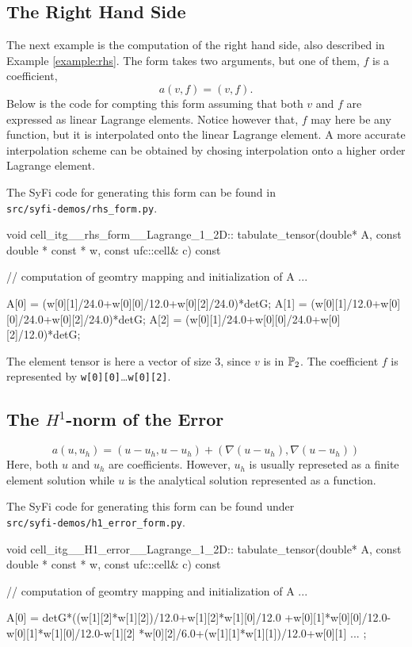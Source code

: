 \subsection{The Right Hand Side}
The next example is the computation of the right hand side, also described in 
Example \ref{example:rhs}. The form takes two arguments, 
but one of them, $f$ is a coefficient,  
\begin{equation}
a(v,f) = (v,f). 
\end{equation}
Below is the code for compting this form assuming that both 
$v$ and $f$ are expressed as linear Lagrange elements. 
Notice  however that, $f$ may here be any function, 
but it is interpolated onto the linear Lagrange element. 
A more accurate interpolation scheme can be obtained 
by chosing interpolation onto a higher order Lagrange element. 


The SyFi code for generating this form can be found in \\
\texttt{src/syfi-demos/rhs\_form.py}.

\begin{code}
void cell_itg__rhs_form__Lagrange_1_2D::
     tabulate_tensor(double* A, const double * const * w,
                     const ufc::cell& c) const
{
  // computation of geomtry mapping and initialization of A ...
 
  A[0] = (w[0][1]/24.0+w[0][0]/12.0+w[0][2]/24.0)*detG;
  A[1] = (w[0][1]/12.0+w[0][0]/24.0+w[0][2]/24.0)*detG;
  A[2] = (w[0][1]/24.0+w[0][0]/24.0+w[0][2]/12.0)*detG;
}
\end{code}
The element tensor is here a vector of size 3, since $v$ is in $\P_2$. 
The coefficient $f$ is represented by \texttt{w[0][0]}\ldots\texttt{w[0][2]}. 

\subsection{The $H^1$-norm of the Error}
\begin{equation}
a(u,u_h) = (u-u_h, u-u_h) + (\nabla (u-u_h), \nabla(u-u_h))    
\end{equation}
Here, both $u$ and $u_h$ are coefficients. However, $u_h$ is usually
represeted as a finite element solution while $u$ is the analytical 
solution represented as a function. 

The SyFi code for generating this form can be found under \\ 
\texttt{src/syfi-demos/h1\_error\_form.py}.

\begin{code}
void cell_itg__H1_error__Lagrange_1_2D::
     tabulate_tensor(double* A, const double * const * w,
                     const ufc::cell& c) const
{

  // computation of geomtry mapping and initialization of A ...

  A[0] = detG*((w[1][2]*w[1][2])/12.0+w[1][2]*w[1][0]/12.0
       +w[0][1]*w[0][0]/12.0-w[0][1]*w[1][0]/12.0-w[1][2]
       *w[0][2]/6.0+(w[1][1]*w[1][1])/12.0+w[0][1]  ... ; 
}
\end{code}
